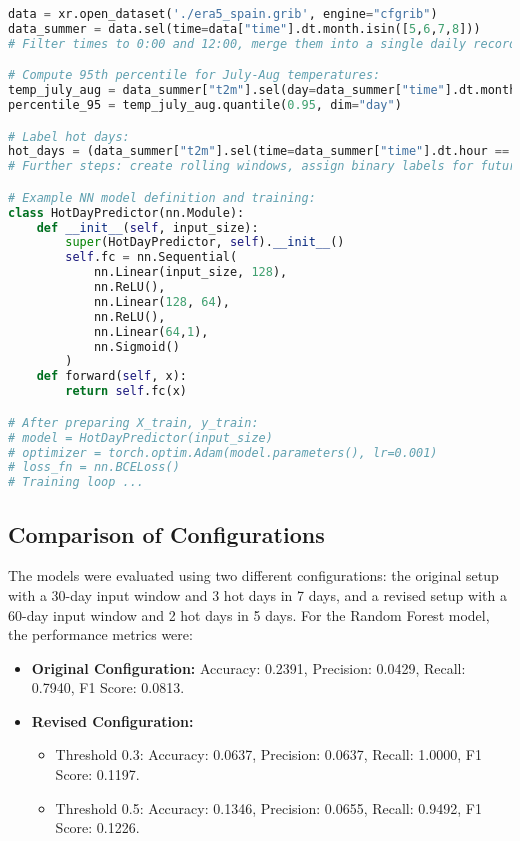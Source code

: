 \documentclass[8pt,a4paper]{article}
\begin{document}
\begin{lstlisting}[language=Python, basicstyle=\ttfamily\scriptsize]
data = xr.open_dataset('./era5_spain.grib', engine="cfgrib")
data_summer = data.sel(time=data["time"].dt.month.isin([5,6,7,8]))
# Filter times to 0:00 and 12:00, merge them into a single daily record, etc.

# Compute 95th percentile for July-Aug temperatures:
temp_july_aug = data_summer["t2m"].sel(day=data_summer["time"].dt.month.isin([7,8]))
percentile_95 = temp_july_aug.quantile(0.95, dim="day")

# Label hot days:
hot_days = (data_summer["t2m"].sel(time=data_summer["time"].dt.hour == 12) > percentile_95)
# Further steps: create rolling windows, assign binary labels for future 7-day hot spells.

# Example NN model definition and training:
class HotDayPredictor(nn.Module):
    def __init__(self, input_size):
        super(HotDayPredictor, self).__init__()
        self.fc = nn.Sequential(
            nn.Linear(input_size, 128),
            nn.ReLU(),
            nn.Linear(128, 64),
            nn.ReLU(),
            nn.Linear(64,1),
            nn.Sigmoid()
        )
    def forward(self, x):
        return self.fc(x)

# After preparing X_train, y_train:
# model = HotDayPredictor(input_size)
# optimizer = torch.optim.Adam(model.parameters(), lr=0.001)
# loss_fn = nn.BCELoss()
# Training loop ...
\end{lstlisting}

\subsection{Comparison of Configurations}
The models were evaluated using two different configurations: the original setup with a 30-day input window and 3 hot days in 7 days, and a revised setup with a 60-day input window and 2 hot days in 5 days. For the Random Forest model, the performance metrics were:

\begin{itemize}
    \item \textbf{Original Configuration:} Accuracy: 0.2391, Precision: 0.0429, Recall: 0.7940, F1 Score: 0.0813.
    \item \textbf{Revised Configuration:}
    \begin{itemize}
        \item Threshold 0.3: Accuracy: 0.0637, Precision: 0.0637, Recall: 1.0000, F1 Score: 0.1197.
        \item Threshold 0.5: Accuracy: 0.1346, Precision: 0.0655, Recall: 0.9492, F1 Score: 0.1226.
    \end{itemize}
\end{itemize}
\end{document}
